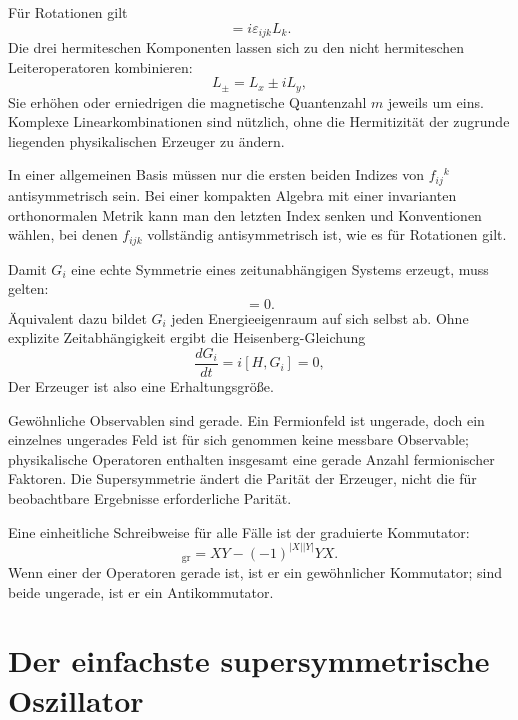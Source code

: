 Für Rotationen gilt
\begin{equation}
[L_i,L_j]=i\varepsilon_{ijk}L_k.
\end{equation}
Die drei hermiteschen Komponenten lassen sich zu den nicht hermiteschen Leiteroperatoren kombinieren:
\begin{equation}
L_\pm=L_x\pm iL_y,
\end{equation}
Sie erhöhen oder erniedrigen die magnetische Quantenzahl \(m\) jeweils um eins. Komplexe Linearkombinationen sind nützlich, ohne die Hermitizität der zugrunde liegenden physikalischen Erzeuger zu ändern.

In einer allgemeinen Basis müssen nur die ersten beiden Indizes von \(f_{ij}{}^k\) antisymmetrisch sein. Bei einer kompakten Algebra mit einer invarianten orthonormalen Metrik kann man den letzten Index senken und Konventionen wählen, bei denen \(f_{ijk}\) vollständig antisymmetrisch ist, wie es für Rotationen gilt. 

Damit \(G_i\) eine echte Symmetrie eines zeitunabhängigen Systems erzeugt, muss gelten:
\begin{equation}
[H,G_i]=0.
\end{equation}
Äquivalent dazu bildet \(G_i\) jeden Energieeigenraum auf sich selbst ab. Ohne explizite Zeitabhängigkeit ergibt die Heisenberg-Gleichung
\begin{equation}
\frac{dG_i}{dt}=i[H,G_i]=0,
\end{equation}
Der Erzeuger ist also eine Erhaltungsgröße.

Gewöhnliche Observablen sind gerade. Ein Fermionfeld ist ungerade, doch ein einzelnes ungerades Feld ist für sich genommen keine messbare Observable; physikalische Operatoren enthalten insgesamt eine gerade Anzahl fermionischer Faktoren. Die Supersymmetrie ändert die Parität der Erzeuger, nicht die für beobachtbare Ergebnisse erforderliche Parität.

Eine einheitliche Schreibweise für alle Fälle ist der graduierte Kommutator:
\begin{equation}
[X,Y]_{\mathrm{gr}}
=XY-(-1)^{|X||Y|}YX.
\end{equation}
Wenn einer der Operatoren gerade ist, ist er ein gewöhnlicher Kommutator; sind beide ungerade, ist er ein Antikommutator.

\section{Der einfachste supersymmetrische Oszillator}

